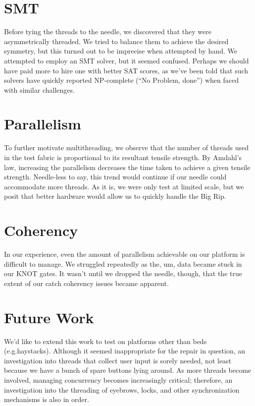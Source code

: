 \documentclass[letterpaper,12pt]{article}
\begin{document}
\begin{multicols}{2}
\section{SMT}
Before tying the threads to the needle, we discovered that they were asymmetrically threaded.
We tried to balance them to achieve the desired symmetry, but this turned out to be imprecise when attempted by hand.
We attempted to employ an SMT solver, but it seemed confused.
Perhaps we should have paid more to hire one with better SAT scores, as we've been told that such solvers have quickly reported NP-complete (``No Problem, done'') when faced with similar challenges.

\section{Parallelism}
\label{sec:parallelism}
To further motivate multithreading, we observe that the number of threads used in the test fabric is proportional to its resultant tensile strength.
By Amdahl's law, increasing the parallelism decreases the time taken to achieve a given tensile strength.
Needle-less to say, this trend would continue if our needle could accommodate more threads.
As it is, we were only test at limited scale, but we posit that better hardware would allow us to quickly handle the Big Rip.

\section{Coherency}
In our experience, even the amount of parallelism achievable on our platform is difficult to manage.
We struggled repeatedly as the, um, data became stuck in our KNOT gates.
It wasn't until we dropped the needle, though, that the true extent of our catch coherency issues became apparent.

\section{Future Work}
We'd like to extend this work to test on platforms other than beds (e.g.\@ haystacks).
Although it seemed inappropriate for the repair in question, an investigation into threads that collect user input is sorely needed, not least because we have a bunch of spare buttons lying around.
As more threads become involved, managing concurrency becomes increasingly critical; therefore, an investigation into the threading of eyebrows, locks, and other synchronization mechanisms is also in order.


\end{multicols}
\end{document}
